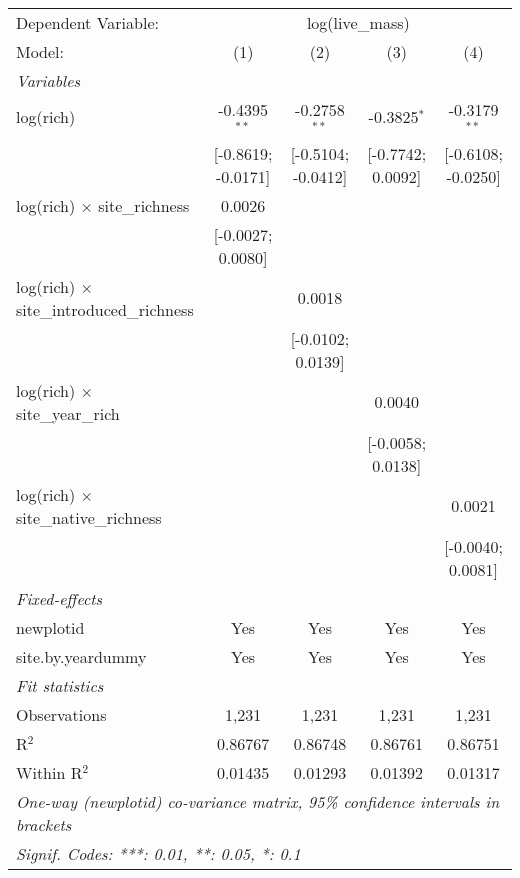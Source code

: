 \begin{tabular}{lcccc}
\tabularnewline\midrule\midrule
Dependent Variable:&\multicolumn{4}{c}{log(live\_mass)}\\
Model:&(1) & (2) & (3) & (4)\\
\midrule \emph{Variables}&   &   &   &  \\
log(rich)&-0.4395$^{**}$ & -0.2758$^{**}$ & -0.3825$^{*}$ & -0.3179$^{**}$\\
  &[-0.8619; -0.0171] & [-0.5104; -0.0412] & [-0.7742; 0.0092] & [-0.6108; -0.0250]\\
log(rich) $\times $ site\_richness&0.0026 &    &    &   \\
  &[-0.0027; 0.0080] &    &    &   \\
log(rich) $\times $ site\_introduced\_richness&   & 0.0018 &    &   \\
  &   & [-0.0102; 0.0139] &    &   \\
log(rich) $\times $ site\_year\_rich&   &    & 0.0040 &   \\
  &   &    & [-0.0058; 0.0138] &   \\
log(rich) $\times $ site\_native\_richness&   &    &    & 0.0021\\
  &   &    &    & [-0.0040; 0.0081]\\
\midrule \emph{Fixed-effects}&   &   &   &  \\
newplotid & Yes & Yes & Yes & Yes\\
site.by.yeardummy & Yes & Yes & Yes & Yes\\
\midrule \emph{Fit statistics}&  & & & \\
Observations & 1,231&1,231&1,231&1,231\\
R$^2$ & 0.86767&0.86748&0.86761&0.86751\\
Within R$^2$ & 0.01435&0.01293&0.01392&0.01317\\
\midrule\midrule\multicolumn{5}{l}{\emph{One-way (newplotid) co-variance matrix, 95\% confidence intervals in brackets}}\\
\multicolumn{5}{l}{\emph{Signif. Codes: ***: 0.01, **: 0.05, *: 0.1}}\\
\end{tabular}



